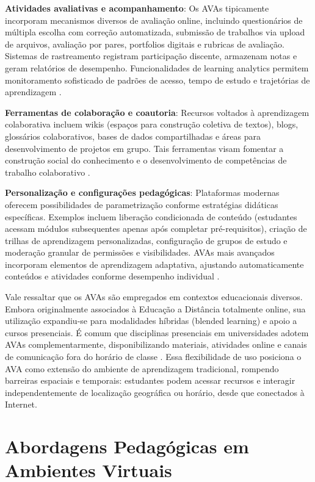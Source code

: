 \documentclass[portuguese]{sbc2025}%
\begin{document}
\textbf{Atividades avaliativas e acompanhamento}: Os AVAs tipicamente incorporam mecanismos diversos de avaliação online, incluindo questionários de múltipla escolha com correção automatizada, submissão de trabalhos via upload de arquivos, avaliação por pares, portfolios digitais e rubricas de avaliação. Sistemas de rastreamento registram participação discente, armazenam notas e geram relatórios de desempenho. Funcionalidades de learning analytics permitem monitoramento sofisticado de padrões de acesso, tempo de estudo e trajetórias de aprendizagem \cite{Siemens2013}.

\textbf{Ferramentas de colaboração e coautoria}: Recursos voltados à aprendizagem colaborativa incluem wikis (espaços para construção coletiva de textos), blogs, glossários colaborativos, bases de dados compartilhadas e áreas para desenvolvimento de projetos em grupo. Tais ferramentas visam fomentar a construção social do conhecimento e o desenvolvimento de competências de trabalho colaborativo \cite{Dillenbourg1999}.

\textbf{Personalização e configurações pedagógicas}: Plataformas modernas oferecem possibilidades de parametrização conforme estratégias didáticas específicas. Exemplos incluem liberação condicionada de conteúdo (estudantes acessam módulos subsequentes apenas após completar pré-requisitos), criação de trilhas de aprendizagem personalizadas, configuração de grupos de estudo e moderação granular de permissões e visibilidades. AVAs mais avançados incorporam elementos de aprendizagem adaptativa, ajustando automaticamente conteúdos e atividades conforme desempenho individual \cite{Oxman2008}.

Vale ressaltar que os AVAs são empregados em contextos educacionais diversos. Embora originalmente associados à Educação a Distância totalmente online, sua utilização expandiu-se para modalidades híbridas (blended learning) e apoio a cursos presenciais. É comum que disciplinas presenciais em universidades adotem AVAs complementarmente, disponibilizando materiais, atividades online e canais de comunicação fora do horário de classe \cite{Graham2006, Dziuban2018}. Essa flexibilidade de uso posiciona o AVA como extensão do ambiente de aprendizagem tradicional, rompendo barreiras espaciais e temporais: estudantes podem acessar recursos e interagir independentemente de localização geográfica ou horário, desde que conectados à Internet.

\section{Abordagens Pedagógicas em Ambientes Virtuais}
\label{sec:pedagogia}
\end{document}
